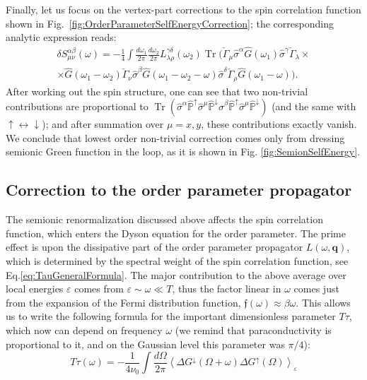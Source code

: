 \documentclass[twocolumn,english,prb]{revtex4-1}
\newcommand{\Tr}{\operatorname{Tr}}
\begin{document}
Finally, let us focus on the vertex-part  corrections to the spin correlation function shown in 
Fig.~\ref{fig:OrderParameterSelfEnergyCorrection}; the corresponding analytic expression reads:
\begin{multline}
\delta S_{\mu \nu}^{\alpha\beta}(\omega)=-\frac{1}{4}\int\frac{d\omega_{1}}{2\pi}\frac{d\omega_{2}}{2\pi} L^{\gamma \delta}_{\lambda \rho}(\omega_{2})\Tr\Big(\check{\Gamma}_{\mu}\hat{\sigma}^{\alpha}\hat{G}(\omega_{1})\hat{\sigma}^{\gamma}\check{\Gamma}_{\lambda}\times\\
\times\hat{G}(\omega_{1}-\omega_{2})\check{\Gamma}_{\nu}\hat{\sigma}^{\beta}\hat{G}(\omega_{1}-\omega_{2}-\omega)\hat{\sigma}^{\delta}\check{\Gamma}_{\rho}\hat{G}(\omega_{1}-\omega)\Big).
\end{multline}
After working out the spin structure, one can see that two non-trivial contributions are proportional to $\Tr(\hat{\sigma}^{\alpha}\hat{\mathbb{P}}^{\uparrow}\hat{\sigma}^{\mu}\hat{\mathbb{P}}^{\downarrow}\hat{\sigma}^{\beta}\hat{\mathbb{P}}^{\uparrow}\hat{\sigma}^{\mu}\hat{\mathbb{P}}^{\downarrow})$ (and the same with $\uparrow \leftrightarrow \downarrow$); and after summation over $\mu = x,y$, these contributions exactly vanish. We conclude that lowest order non-trivial correction comes only from dressing semionic Green function in the loop, as it is  shown in Fig. \ref{fig:SemionSelfEnergy}.


\subsection{Correction to the order parameter propagator}
\label{sec:OrderParameterCorrection}

The semionic renormalization discussed above affects the spin correlation function, which enters the Dyson equation for the order parameter.
The prime effect is upon the dissipative part of the order parameter propagator $L(\omega,\boldsymbol{q})$, which is
determined  by the spectral weight of the spin correlation function, see Eq.\eqref{eq:TauGeneralFormula}. 
The major contribution to the above average over local energies $\varepsilon$ comes from $\varepsilon \sim \omega \ll T$, 
 thus the factor linear in  $\omega$  comes  just from the expansion of the Fermi distribution function,
 $\mathfrak{f}(\omega) \approx \beta \omega$. 
 This allows us to write the following formula for the important dimensionless parameter $T \tau$, which now can depend on frequency $\omega$ (we remind that paraconductivity is proportional to it, and on the Gaussian level this parameter was $\pi/4$):
\begin{equation}
\label{eq:TtauGeneral}
T\tau(\omega)=-\frac{1}{4\nu_{0}}\int\frac{d\Omega}{2\pi}\left\langle\Delta G^{\downarrow}(\Omega+\omega)\Delta G^{\uparrow}(\Omega)\right\rangle _{\varepsilon}
\end{equation}
\end{document}
